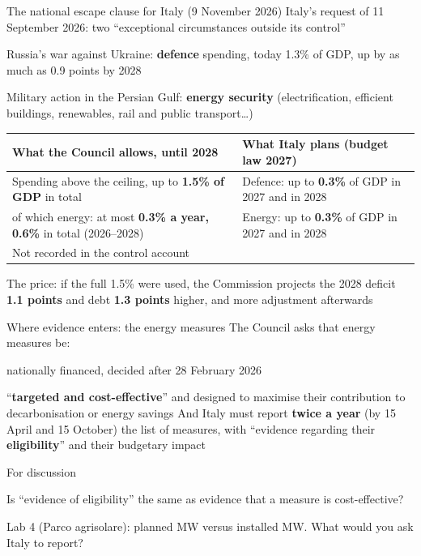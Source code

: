 \documentclass[aspectratio=169,xcolor=table]{beamer}
\begin{document}
\begin{frame}{The national escape clause for Italy (9 November 2026)}
\footnotesize
Italy's request of 11 September 2026: two ``exceptional circumstances outside its control''
\bi
  \item Russia's war against Ukraine: \textbf{defence} spending, today 1.3\% of GDP, up by as much as 0.9 points by 2028
  \item Military action in the Persian Gulf: \textbf{energy security} (electrification, efficient buildings, renewables, rail and public transport\ldots)
\ei
\vspace{0.05cm}
\centering\scriptsize
\begin{tabular}{L{6.0cm}L{6.0cm}}
\toprule
\textbf{What the Council allows, until 2028} & \textbf{What Italy plans (budget law 2027)}\\
\midrule
Spending above the ceiling, up to \textbf{1.5\% of GDP} in total & Defence: up to \textbf{0.3\%} of GDP in 2027 and in 2028 \\
of which energy: at most \textbf{0.3\% a year, 0.6\%} in total (2026--2028) & Energy: up to \textbf{0.3\%} of GDP in 2027 and in 2028 \\
Not recorded in the control account & \\
\bottomrule
\end{tabular}
\vspace{0.1cm}

\raggedright\footnotesize
The price: if the full 1.5\% were used, the Commission projects the 2028 deficit \textbf{1.1 points} and debt \textbf{1.3 points} higher, and more adjustment afterwards
\end{frame}

\begin{frame}{Where evidence enters: the energy measures}
\footnotesize
The Council asks that energy measures be:
\bi
  \item nationally financed, decided after 28 February 2026
  \item ``\textbf{targeted and cost-effective}'' and designed to maximise their contribution to decarbonisation or energy savings
\ei
\vspace{0.1cm}
And Italy must report \textbf{twice a year} (by 15 April and 15 October) the list of measures, with ``evidence regarding their \textbf{eligibility}'' and their budgetary impact
\vspace{0.15cm}

\begin{block}{For discussion}
\bi
  \item Is ``evidence of eligibility'' the same as evidence that a measure is cost-effective?
  \item Lab 4 (Parco agrisolare): planned MW versus installed MW. What would you ask Italy to report?
\ei
\end{block}
\end{frame}
\end{document}
